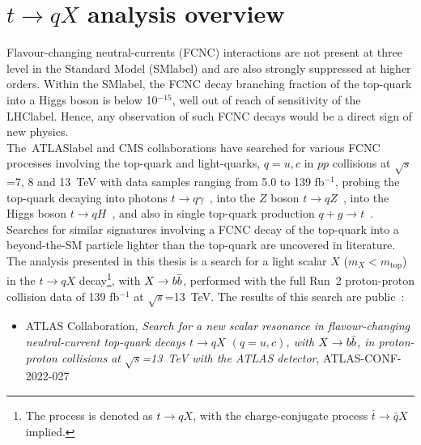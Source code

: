 \chapter{$t\to qX$ analysis overview}
\label{chapter:tqXanalysis}

Flavour-changing neutral-currents (FCNC) interactions are not present at three level in the Standard Model (\acrshort{SMlabel}) and are also strongly suppressed at higher orders. Within the \acrshort{SMlabel}, the FCNC decay branching fraction of the top-quark into a Higgs boson is below 10$^{-15}$, well out of reach of sensitivity of the \acrshort{LHClabel}. Hence, any observation of such FCNC decays would be a direct sign of new physics.\\

The~\acrshort{ATLASlabel} and CMS collaborations have searched for various FCNC processes involving the top-quark and light-quarks, $q=u,c$ in $pp$ collisions at $\sqrt{s}$=7, 8 and 13~TeV with data samples ranging from 5.0 to 139 fb$^{-1}$, probing the top-quark decaying into photons $t\to q\gamma$~\cite{tqgamma2022,tqgamma2020,tqgamma2015CMS,Tumasyan_2022}, into the $Z$ boson $t\to qZ$~\cite{Sirunyan_2017,tqZ2018,ATLAS-CONF-2021-049,CMS-PAS-TOP-17-017}, into the Higgs boson $t\to qH$~\cite{ATLAStqHtautau,TOPQ-2017-07,CMStqHRun2,Khachatryan_2017}, and also in single top-quark production $q+g\to t$~\cite{tqgluon2016,tqgluon2021,tqgluon2017CMS}. Searches for similar signatures involving a FCNC decay of the top-quark into a beyond-the-SM particle lighter than the top-quark are uncovered in literature.\\

The analysis presented in this thesis is a search for a light scalar $X$ ($m_X < m_\text{top}$) in the $t\to qX$ decay\footnote{The process is denoted as $t\to qX$, with the charge-conjugate process $\bar{t}\to\bar{q}X$ implied.}, with $X\to b\bar{b}$, performed with the full Run~2 proton-proton collision data of 139 fb$^{-1}$ at $\sqrt{s}$=13~TeV. The results of this search are public~\cite{ATLAS-CONF-2022-027}:

\begin{itemize}
    \item ATLAS Collaboration, \textit{Search for a new scalar resonance in flavour-changing neutral-current top-quark decays $t\to qX$ $(q=u,c)$, with $X\to b\bar{b}$, in proton-proton collisions at $\sqrt{s}$=13~TeV with the ATLAS detector}, ATLAS-CONF-2022-027

\end{itemize}

